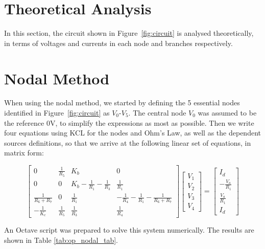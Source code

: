 \section{Theoretical Analysis}
\label{sec:analysis}

In this section, the circuit shown in Figure~\ref{fig:circuit} is analysed
theoretically, in terms of voltages and currents in each node and branches respectively.


\section{Nodal Method}

When using the nodal method, we started by defining the 5 essential nodes identified in Figure~\ref{fig:circuit} as $V_0$-$V_5$. The central node $V_0$ was assumed to be the reference 0V, to simplify the expressions as most as possible.
Then we write four equations using KCL for the nodes and Ohm's Law, as well as the dependent sources definitions, so that we arrive at the following linear set of equations, in matrix form:


\[
  \begin{bmatrix}
    0                   & \frac{1}{R_5} & K_b                                 & 0                                              \\
    0                   & 0             & K_b - \frac{1}{R_1} - \frac{1}{R_3} & \frac{1}{R_1}                                  \\
    \frac{1}{R_6 + R_7} & 0             & \frac{1}{R_1}                       & -\frac{1}{R_4}-\frac{1}{R_1}-\frac{1}{R_6+R_7} \\
    -\frac{1}{K_c}      & \frac{1}{R_5} & \frac{1}{R_3}                       & \frac{1}{R_4}
  \end{bmatrix}
  \begin{bmatrix}
    V_1 \\ V_2 \\ V_3 \\ V_4
  \end{bmatrix}
  =
  \begin{bmatrix}
    I_d \\ -\frac{V_a}{R_1} \\ \frac{V_a}{R_1} \\ I_d
  \end{bmatrix}
\]

\hfill


An Octave script was prepared to solve this system numerically. The results are shown in Table \ref{tab:op_nodal_tab}.

